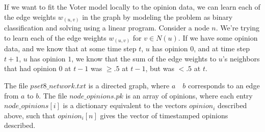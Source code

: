 \documentclass[11pt]{article}
\begin{document}
\par If we want to fit the Voter model locally to the opinion data, we can learn each of the edge weights $w_{(u,v)}$ in the graph by modeling the problem as binary classification and solving using a linear program. Consider a node $n$. We're trying to learn each of the edge weights $w_{(u,v)}$ for $v \in N(u)$. If we have some opinion data, and we know that at some time step $t$, $u$ has opinion $0$, and at time step $t+1$, $u$ has opinion $1$, we know that the sum of the edge weights to $u$'s neighbors that had opinion $0$ at $t-1$ was $\ge .5$ at $t-1$, but was $< .5$ at $t$.

\par The file $pset8\_network.txt$ is a directed graph, where $a \quad b$ corresponds to an edge from $a$ to $b$. The file $node\_opinions.pk$ is an array of opinions, where each entry $node\_opinions[i]$ is a dictionary equivalent to the vectors $opinion_i$ described above, such that $opinion_i[n]$ gives the vector of timestamped opinions described.
\end{document}
